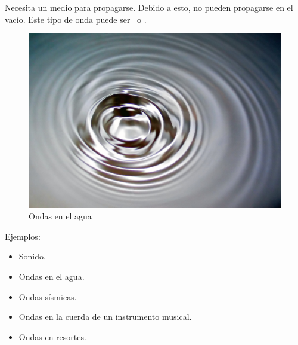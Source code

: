 Necesita un medio para propagarse. Debido a esto, no pueden propagarse en el vacío. Este tipo de onda puede ser \longitudinal\ o \transversal.

\begin{figure}[H]
  \centering
  \includegraphics[scale=0.2]{imagenes/ondas_agua.png}
  \caption{Ondas en el agua\cite{wikiwaves}}
\end{figure}

Ejemplos:

\begin{itemize}
  \item Sonido.
  \item Ondas en el agua.
  \item Ondas sísmicas.
  \item Ondas en la cuerda de un instrumento musical.
  \item Ondas en resortes.
\end{itemize}
